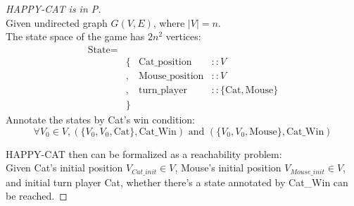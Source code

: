 \documentclass[twoside,11pt]{homework}
\begin{document}
\begin{solution}
\begin{proof}[HAPPY-CAT is in P]
  \ \\
  Given undirected graph $G(V,E)$, where $|V| = n$.\\
  The state space of the game has $2n^2$ vertices:
  \[
    \begin{aligned}
    \text{State} =&\\
      &\{ &\text{Cat\_position} &:: V\\
      &,  &\text{Mouse\_position} &:: V\\
      &,  &\text{turn\_player} &:: \{ \text{Cat}, \text{Mouse}\}\\
      &\}
    \end{aligned}
  \]
  Annotate the states by Cat's win condition:
  \[
    \forall V_0 \in V, (\{V_0, V_0, \text{Cat}\}, \text{Cat\_Win})
    \text{ and } 
    (\{V_0, V_0, \text{Mouse}\}, \text{Cat\_Win})
  \]

  HAPPY-CAT then can be formalized as a reachability problem:\\
  Given Cat's initial position $V_{Cat\_init} \in V$,
  Mouse's initial position $V_{Mouse\_init} \in V$,
  and initial turn player Cat, whether there's a state annotated by Cat\_Win can
  be reached.
\end{proof}
\end{solution}
\end{document}
